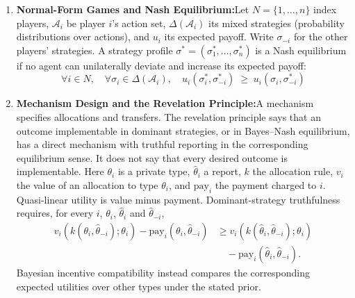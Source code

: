 \begin{enumerate}[leftmargin=1.8em,itemsep=3pt]
  \item \textbf{Normal-Form Games and Nash Equilibrium:}\enspace Let $N=\{1,\ldots,n\}$ index players, $\mathcal A_i$ be player $i$'s action set, $\Delta(\mathcal A_i)$ its mixed strategies (probability distributions over actions), and $u_i$ its expected payoff. Write $\sigma_{-i}$ for the other players' strategies. A strategy profile $\sigma^* = (\sigma_1^*, \dots, \sigma_n^*)$ is a Nash equilibrium if no agent can unilaterally deviate and increase its expected payoff:
  \begin{equation}
  \forall i \in N, \quad \forall \sigma_i \in \Delta(\mathcal A_i), \quad u_i(\sigma_i^*, \sigma_{-i}^*) \;\ge\; u_i(\sigma_i, \sigma_{-i}^*)
  \end{equation}

  \item \textbf{Mechanism Design and the Revelation Principle:}\enspace A mechanism specifies allocations and transfers. The revelation principle says that an outcome implementable in dominant strategies, or in Bayes--Nash equilibrium, has a direct mechanism with truthful reporting in the corresponding equilibrium sense. It does not say that every desired outcome is implementable. Here $\theta_i$ is a private type, $\hat\theta_i$ a report, $k$ the allocation rule, $v_i$ the value of an allocation to type $\theta_i$, and $\mathrm{pay}_i$ the payment charged to $i$. Quasi-linear utility is value minus payment. Dominant-strategy truthfulness requires, for every $i$, $\theta_i$, $\hat\theta_i$ and $\hat\theta_{-i}$,
  \begin{align}
  v_i(k(\theta_i,\hat\theta_{-i});\theta_i)-\mathrm{pay}_i(\theta_i,\hat\theta_{-i})
  &\ge v_i(k(\hat\theta_i,\hat\theta_{-i});\theta_i)\nonumber\\
  &\quad-\mathrm{pay}_i(\hat\theta_i,\hat\theta_{-i}).
  \end{align}
  Bayesian incentive compatibility instead compares the corresponding expected utilities over other types under the stated prior.


\end{enumerate}
